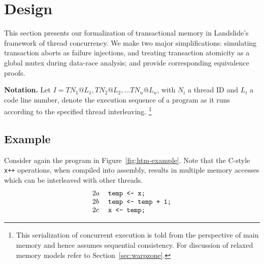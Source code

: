 \documentclass[10pt]{sigplanconf}
\begin{document}
\section{Design}
\label{sec:design}

This section presents our formalization of transactional memory in Landslide's framework of thread concurrency.
We make two major simplifications:
simulating transaction aborts as failure injections,
and treating transaction atomicity as a global mutex during data-race analysis;
and provide corresponding equivalence proofs.

{\bf Notation.} Let $I = TN_1@L_1, TN_2@L_2, ... TN_n@L_n$,
with $N_i$ a thread ID and $L_i$ a code line number,
denote the execution sequence of a program as it runs according to the specified thread interleaving.%
\footnote{This serialization of concurrent execution is told from the perspective of main memory
and hence assumes sequential consistency.
For discussion of relaxed memory models refer to Section~\ref{sec:warpzone}.}

\subsection{Example}

Consider again the program in Figure~\ref{fig:htm-example}.
Note that the C-style {\tt x++} operations, when compiled into assembly,
results in multiple memory accesses which can be interleaved with other threads.
\[
\begin{tabular}{ll}
	$2a$ & \texttt{temp <- x;} \\
	$2b$ & \texttt{temp <- temp + 1;} \\
	$2c$ & \texttt{x <- temp;} \\
\end{tabular}
\]

\newcommand\ti{\ensuremath{\hilight{lavender}{\mathbf{T1}}}\xspace}
\newcommand\tj{\ensuremath{\hilight{seafoam}{\mathbf{T2}}}\xspace}
\newcommand\tk{\ensuremath{\hilight{salmon}{\mathbf{T3}}}\xspace}

\newcommand\tiat[1]{\ensuremath{\hilight{lavender}{\mathbf{T1}@#1}}\xspace}
\newcommand\tjat[1]{\ensuremath{\hilight{seafoam}{\mathbf{T2}@#1}}\xspace}
\newcommand\tkat[1]{\ensuremath{\hilight{salmon}{\mathbf{T3}@#1}}\xspace}
\end{document}
